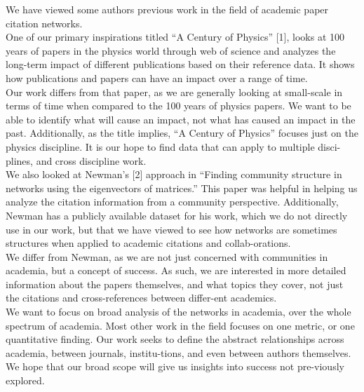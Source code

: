 \documentclass[times, 10pt,twocolumn]{article}
\begin{document}
We have viewed some authors previous work in the field of academic paper citation networks. \\
One of our primary inspirations titled “A Century of Physics” [1], looks at 100 years of papers in the physics world through web of science and analyzes the long-term impact of different publications based on their reference data. It shows how publications and papers can have an impact over a range of time.\\
Our work differs from that paper, as we are generally looking at small-scale in terms of time when compared to the 100 years of physics papers. We want to be able to identify what will cause an impact, not what has caused an impact in the past. Additionally, as the title implies, “A Century of Physics” focuses just on the physics discipline. It is our hope to find data that can apply to multiple disci-plines, and cross discipline work. \\
We also looked at Newman’s [2] approach in “Finding community structure in networks using the eigenvectors of matrices.” This paper was helpful in helping us analyze the citation information from a community perspective. Additionally, Newman has a publicly available dataset for his work, which we do not directly use in our work, but that we have viewed to see how networks are sometimes structures when applied to academic citations and collab-orations.\\
We differ from Newman, as we are not just concerned with communities in academia, but a concept of success. As such, we are interested in more detailed information about the papers themselves, and what topics they cover, not just the citations and cross-references between differ-ent academics. \\
We want to focus on broad analysis of the networks in academia, over the whole spectrum of academia. Most other work in the field focuses on one metric, or one quantitative finding. Our work seeks to define the abstract relationships across academia, between journals, institu-tions, and even between authors themselves. We hope that our broad scope will give us insights into success not pre-viously explored.
\end{document}
